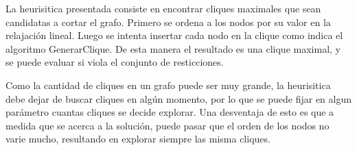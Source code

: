 La heurisitica presentada consiste en encontrar cliques maximales que sean candidatas a cortar el grafo. Primero se ordena a los
nodos por su valor en la relajaci\'on lineal. Luego se intenta insertar cada nodo en la clique como indica el algoritmo GenerarClique. De esta manera
el resultado es una clique maximal, y se puede evaluar si viola el conjunto de resticciones.

Como la cantidad de cliques en un grafo puede ser muy grande, la heurisitica debe dejar de buscar cliques en alg\'un momento, por lo que se puede
fijar en algun par\'ametro cuantas cliques se decide explorar.
Una desventaja de esto es que a medida que se acerca a la soluci\'on, puede pasar que el orden de los nodos no varie mucho, resultando en explorar siempre las misma cliques.







